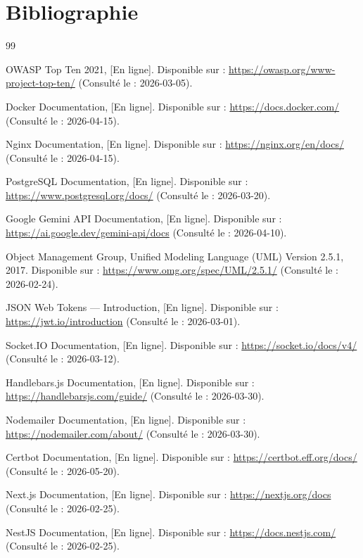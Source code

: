 \chapter*{Bibliographie}

\begin{thebibliography}{99}

OWASP Top Ten 2021, [En ligne]. Disponible sur :
\url{https://owasp.org/www-project-top-ten/} (Consulté le : 2026-03-05).

Docker Documentation, [En ligne]. Disponible sur :
\url{https://docs.docker.com/} (Consulté le : 2026-04-15).

Nginx Documentation, [En ligne]. Disponible sur :
\url{https://nginx.org/en/docs/} (Consulté le : 2026-04-15).

PostgreSQL Documentation, [En ligne]. Disponible sur :
\url{https://www.postgresql.org/docs/} (Consulté le : 2026-03-20).

Google Gemini API Documentation, [En ligne]. Disponible sur :
\url{https://ai.google.dev/gemini-api/docs} (Consulté le : 2026-04-10).

Object Management Group, Unified Modeling Language (UML) Version 2.5.1, 2017.
Disponible sur :
\url{https://www.omg.org/spec/UML/2.5.1/} (Consulté le : 2026-02-24).

JSON Web Tokens --- Introduction, [En ligne]. Disponible sur :
\url{https://jwt.io/introduction} (Consulté le : 2026-03-01).

Socket.IO Documentation, [En ligne]. Disponible sur :
\url{https://socket.io/docs/v4/} (Consulté le : 2026-03-12).

Handlebars.js Documentation, [En ligne]. Disponible sur :
\url{https://handlebarsjs.com/guide/} (Consulté le : 2026-03-30).

Nodemailer Documentation, [En ligne]. Disponible sur :
\url{https://nodemailer.com/about/} (Consulté le : 2026-03-30).

Certbot Documentation, [En ligne]. Disponible sur :
\url{https://certbot.eff.org/docs/} (Consulté le : 2026-05-20).

Next.js Documentation, [En ligne]. Disponible sur :
\url{https://nextjs.org/docs} (Consulté le : 2026-02-25).

NestJS Documentation, [En ligne]. Disponible sur :
\url{https://docs.nestjs.com/} (Consulté le : 2026-02-25).


\end{thebibliography}
